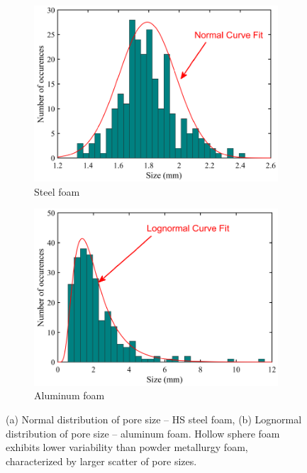 \documentclass[review]{elsarticle}
\begin{document}
\begin{figure}
	\centering
	\begin{subfigure}{.5\textwidth}
		\centering
		\includegraphics[width=0.95\linewidth]{Tex-Figures/Fig03a.pdf}
		\caption{Steel foam}
		\label{fig3:sub1}
	\end{subfigure}%
	\begin{subfigure}{.5\textwidth}
		\centering
		\includegraphics[width=0.95\linewidth]{Tex-Figures/Fig03b.pdf}
		\caption{Aluminum foam}
		\label{fig3:sub2}
	\end{subfigure}
	\caption{(a) Normal distribution of pore size – HS steel foam, (b) Lognormal distribution of pore size – aluminum foam. Hollow sphere foam exhibits lower variability than powder metallurgy foam, characterized by larger scatter of pore sizes.}
	\label{PoreSizeHistograms}
\end{figure}
\end{document}
